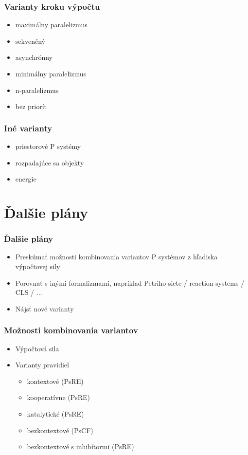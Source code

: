 \documentclass{beamer}
\begin{document}
\begin{frame}[t]\frametitle{Varianty kroku výpočtu}
\begin{itemize}
  \item maximálny paralelizmus
  \item sekvenčný
  \item asynchrónny
  \item minimálny paralelizmus
  \item n-paralelizmus
  \item bez priorít
\end{itemize}
\end{frame}

\begin{frame}[t]\frametitle{Iné varianty}
\begin{itemize}
  \item priestorové P systémy
  \item rozpadajúce sa objekty
  \item energie
\end{itemize}
\end{frame}


\section{Ďalšie plány} %
\label{sec:dalsie_plany}

\begin{frame}[t]\frametitle{Ďalšie plány}
\begin{itemize}
  \item Preskúmať možnosti kombinovania variantov P systémov z hľadiska výpočtovej sily
  \item Porovnať s inými formalizmami, napríklad Petriho siete / reaction systems / CLS / ...
  \item Nájsť nové varianty
\end{itemize}
\end{frame}

\begin{frame}[t]\frametitle{Možnosti kombinovania variantov}
\begin{itemize}
  \item Výpočtová sila
  \item Varianty pravidiel
  \begin{itemize}
    \item kontextové (PsRE)
    \item kooperatívne (PsRE)
    \item katalytické (PsRE)
    \item bezkontextové (PsCF)

    \item bezkontextové s inhibítormi (PsRE)
  \end{itemize}
\end{itemize}
\end{frame}
\end{document}
